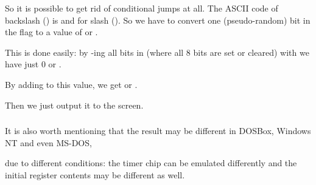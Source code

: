 

So it is possible to get rid of conditional jumps at all.
The \ac{ASCII} code of backslash (\q{\textbackslash{}}) 
is  and  for slash (\q{/}).
So we have to convert one (pseudo-random) bit in the  flag to a value of  or .

This is done easily: by -ing all bits in  (where all 8 bits are set or cleared) with  we have just 0 or .

By adding  to this value, we get  or .

Then we just output it to the screen.

\subsubsection{\Conclusion{}}

It is also worth mentioning that the result may 
be different in DOSBox, \gls{Windows NT} and even MS-DOS, 

due to different
conditions: the timer chip can be emulated differently and the initial register contents may be different as well.
